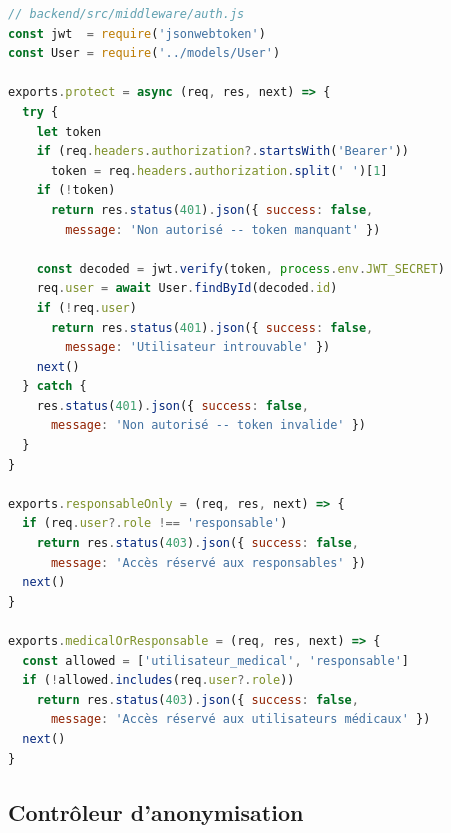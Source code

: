 \begin{lstlisting}[language=JavaScript, caption={Middleware d'authentification JWT et contrôle RBAC}, label={lst:middleware_auth}]
// backend/src/middleware/auth.js
const jwt  = require('jsonwebtoken')
const User = require('../models/User')

exports.protect = async (req, res, next) => {
  try {
    let token
    if (req.headers.authorization?.startsWith('Bearer'))
      token = req.headers.authorization.split(' ')[1]
    if (!token)
      return res.status(401).json({ success: false,
        message: 'Non autorisé -- token manquant' })

    const decoded = jwt.verify(token, process.env.JWT_SECRET)
    req.user = await User.findById(decoded.id)
    if (!req.user)
      return res.status(401).json({ success: false,
        message: 'Utilisateur introuvable' })
    next()
  } catch {
    res.status(401).json({ success: false,
      message: 'Non autorisé -- token invalide' })
  }
}

exports.responsableOnly = (req, res, next) => {
  if (req.user?.role !== 'responsable')
    return res.status(403).json({ success: false,
      message: 'Accès réservé aux responsables' })
  next()
}

exports.medicalOrResponsable = (req, res, next) => {
  const allowed = ['utilisateur_medical', 'responsable']
  if (!allowed.includes(req.user?.role))
    return res.status(403).json({ success: false,
      message: 'Accès réservé aux utilisateurs médicaux' })
  next()
}
\end{lstlisting}

\subsection{Contrôleur d'anonymisation}

